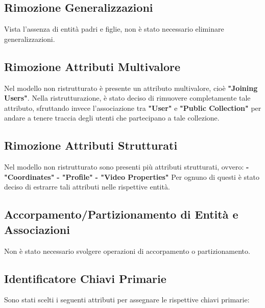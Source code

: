         \subsection{Rimozione Generalizzazioni}

        Vista l'assenza di entità padri e figlie, non è stato necessario eliminare generalizzazioni.

        \subsection{Rimozione Attributi Multivalore}

        Nel modello non ristrutturato è presente un attributo multivalore, cioè \textbf{"Joining Users"}. 
        \break
        Nella ristrutturazione, è stato deciso di rimuovere completamente tale attributo, sfruttando invece l'associazione tra \textbf{"User"} e \textbf{"Public Collection"} per andare a tenere traccia degli utenti che partecipano a tale collezione.
            
        \subsection{Rimozione Attributi Strutturati}

        Nel modello non ristrutturato sono presenti più attributi strutturati, ovvero:
        \break\textbf{- "Coordinates"}
        \break\textbf{- "Profile"}
        \break\textbf{- "Video Properties"}
        \break
        Per ognuno di questi è stato deciso di estrarre tali attributi nelle rispettive entità.
            
        \subsection{Accorpamento/Partizionamento di Entità e Associazioni}
        Non è stato necessario svolgere operazioni di accorpamento o partizionamento.

        \pagebreak
        
        \subsection{Identificatore Chiavi Primarie}

        Sono stati scelti i seguenti attributi per assegnare le rispettive chiavi primarie:

        \vspace{1em}
      
